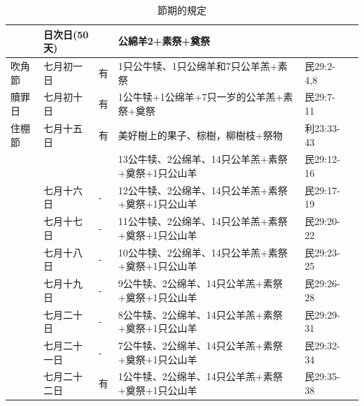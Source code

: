 \begin{table}[H]
\begin{tabular}{l|l|l|l|l|l}
&日次日(50天)&  &公綿羊2+素祭+奠祭 &\\ \hline
吹角節&七月初一日& 有&  1只公牛犊、1只公绵羊和7只公羊羔+素祭&民29:2-4,8\\ \hline
贖罪日&七月初十日& 有 &1公牛犊+1公绵羊+7只一岁的公羊羔+素祭+奠祭&民29:7-11\\ \hline
住棚節&七月十五日& 有 & 美好樹上的果子、棕樹，柳樹枝+祭物&利23:33-43\\
&&  &13公牛犊、2公绵羊、14只公羊羔+素祭+奠祭+1只公山羊&民29:12-16\\
      &七月十六日& - &12公牛犊、2公绵羊、14只公羊羔+素祭+奠祭+1只公山羊&民29:17-19 \\
      &七月十七日& - &11公牛犊、2公绵羊、14只公羊羔+素祭+奠祭+1只公山羊&民29:20-22 \\
      &七月十八日& - &10公牛犊、2公绵羊、14只公羊羔+素祭+奠祭+1只公山羊&民29:23-25\\
      &七月十九日& - &9公牛犊、2公绵羊、14只公羊羔+素祭+奠祭+1只公山羊&民29:26-28 \\     
      &七月二十日& - &8公牛犊、2公绵羊、14只公羊羔+素祭+奠祭+1只公山羊&民29:29-31 \\
      &七月二十一日& - &7公牛犊、2公绵羊、14只公羊羔+素祭+奠祭+1只公山羊&民29:32-34 \\
      &七月二十二日& 有 &1公牛犊、2公绵羊、14只公羊羔+素祭+奠祭+1只公山羊&民29:35-38  \\  \hline                    
\end{tabular}
\caption{節期的規定}
\end{table}

